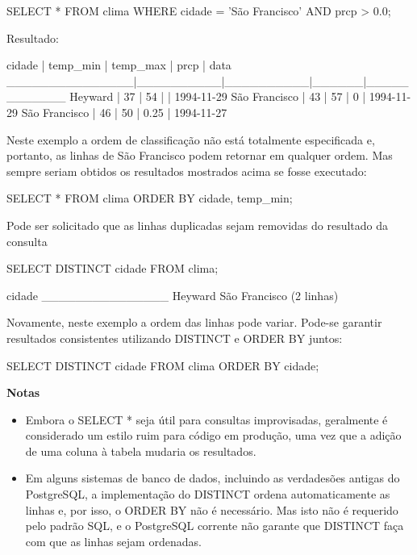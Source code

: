 \begin{BoxVerbatim}
SELECT * FROM clima
    WHERE cidade = 'São Francisco' AND prcp > 0.0;
\end{BoxVerbatim}
Resultado:

\begin{BoxVerbatim}
   cidade      | temp_min | temp_max | prcp |    data
_______________|__________|__________|______|____________
Heyward        |      37  |      54  |      | 1994-11-29
São Francisco  |      43  |      57  |    0 | 1994-11-29
São Francisco  |      46  |      50  | 0.25 | 1994-11-27
\end{BoxVerbatim}

Neste exemplo a ordem de classificação não está totalmente especificada e, portanto, as linhas de São Francisco podem retornar em qualquer ordem. Mas sempre seriam obtidos os resultados mostrados acima se fosse executado:
\begin{BoxVerbatim}
SELECT * FROM clima
    ORDER BY cidade, temp_min;
\end{BoxVerbatim}

Pode ser solicitado que as linhas duplicadas sejam removidas do resultado da consulta
\begin{BoxVerbatim}
SELECT DISTINCT cidade
    FROM clima;


    cidade
_______________
 Heyward
 São Francisco
 (2 linhas)
\end{BoxVerbatim}

Novamente, neste exemplo a ordem das linhas pode variar. Pode-se garantir resultados consistentes utilizando DISTINCT e ORDER BY juntos:
\begin{BoxVerbatim}
SELECT DISTINCT cidade
    FROM clima
        ORDER BY cidade;
\end{BoxVerbatim}

{\bf Notas}
\begin{itemize}
	\item{\bf }Embora o SELECT * seja útil para consultas improvisadas, geralmente é considerado um estilo ruim para código em produção, uma vez que a adição de uma coluna à tabela mudaria os resultados.
	\item{\bf }Em alguns sistemas de banco de dados, incluindo as verdadesões antigas do PostgreSQL, a implementação do DISTINCT ordena automaticamente as linhas e, por isso, o ORDER BY não é necessário. Mas isto não é requerido pelo padrão SQL, e o PostgreSQL corrente não garante que DISTINCT faça com que as linhas sejam ordenadas.
\end{itemize}

